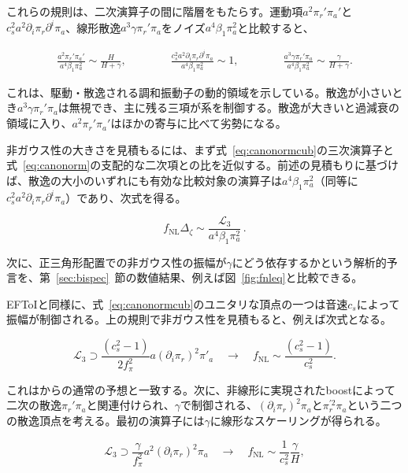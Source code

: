 \documentclass[a4paper,11pt]{ltjsarticle}
\numberwithin{equation}{section}
\def\pia{\pi_{a}}
\def\pir{\pi_{r}}
\newcommand{\Eq}[1]{Eq.~(\ref{#1})}
\newcommand{\Fig}[1]{Fig.~{\ref{#1}}}
\newcommand{\Sec}[1]{Sec.~\ref{#1}}
\renewcommand{\Eq}[1]{式~\eqref{#1}}
\renewcommand{\Fig}[1]{図~\ref{#1}}
\renewcommand{\Sec}[1]{第~\ref{#1}~節}
\begin{document}
これらの規則は、二次演算子の間に階層をもたらす。運動項$a^2\pir'\pia'$と$c_s^2a^2\partial_i\pir\partial^i\pia$、線形散逸$a^3\gamma\pir'\pia$をノイズ$a^4\beta_1\pia^2$と比較すると、

\begin{align}\label{eq:quad1}
    \frac{a^2 \pir'\pia'}{a^{4} \beta_1 \pia^2} \sim \frac{H}{H+\gamma}, \qquad  \qquad  \frac{c_s^2 a^2 \partial_i \pir \partial^i \pia}{a^{4} \beta_1 \pia^2} \sim 1, \qquad \qquad \frac{a^3\gamma\pir' \pia}{a^{4} \beta_1 \pia^2} \sim \frac{\gamma}{H+\gamma}.
\end{align}

これは、駆動・散逸される調和振動子の動的領域を示している。散逸が小さいとき$a^3\gamma\pir'\pia$は無視でき、主に残る三項が系を制御する。散逸が大きいと過減衰の領域に入り、$a^2\pir'\pia'$はほかの寄与に比べて劣勢になる。

非ガウス性の大きさを見積もるには、まず\Eq{eq:canonormcub}の三次演算子と\Eq{eq:canonorm}の支配的な二次項との比を近似する。前述の見積もりに基づけば、散逸の大小のいずれにも有効な比較対象の演算子は$a^4\beta_1\pia^2$（同等に$c_s^2a^2\partial_i\pir\partial^i\pia$）であり、次式を得る。

\begin{equation}
    f_{\text{NL}}\Delta_{\zeta}\sim\frac{\mathcal{L}_{3}}{a^{4} \beta_1 \pia^2}\,.
\end{equation}

次に、正三角形配置での非ガウス性の振幅が$\gamma$にどう依存するかという解析的予言を、\Sec{sec:bispec}の数値結果、例えば\Fig{fig:fnleq}と比較できる。

EFToIと同様に、\Eq{eq:canonormcub}のユニタリな頂点の一つは音速$c_s$によって振幅が制御される。上の規則で非ガウス性を見積もると、例えば次式となる。

\begin{equation}
	\mathcal{L}_{3} \supset \frac{(c^2_s-1)}{2f_{\pi}^{2}}  a \left(\partial_i \pir \right)^2 \pi'_a \quad \rightarrow \quad f_{\text{NL}}\sim \frac{(c^2_s-1)}{c_{s}^{2}} .
\end{equation}

これは\cite{Cheung:2007st}からの通常の予想と一致する。次に、非線形に実現されたboostによって二次の散逸$\pir'\pia$と関連付けられ、$\gamma$で制御される、$(\partial_i\pir)^2\pia$と$\pir^{\prime2}\pia$という二つの散逸頂点を考える。最初の演算子には$\gamma$に線形なスケーリングが得られる。

\begin{equation}
    \mathcal{L}_{3} \supset \frac{\gamma}{f_{\pi}^{2}}a^2(\partial_{i}\pir)^{2}\pia \quad \rightarrow \quad f_{\text{NL}}\sim \frac{1}{c_s^2} \frac{\gamma}{H} ,
\end{equation}
\end{document}
